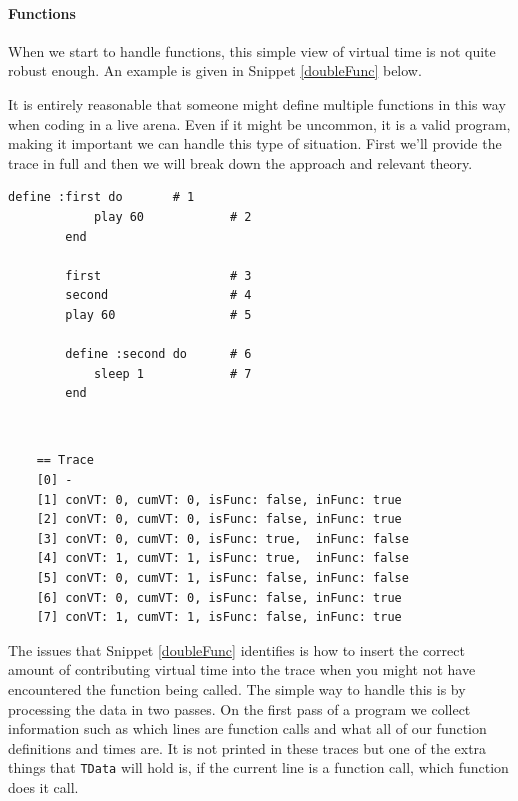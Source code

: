 \documentclass[11pt, abstracton, twoside]{scrartcl}
\begin{document}
\paragraph{Functions}
When we start to handle functions, this simple view of virtual time is not
quite robust enough. An example is given in Snippet \ref{doubleFunc} below.

It is entirely reasonable that someone might define multiple functions in this 
way when coding in a live arena. Even if it might be uncommon, it is a valid
program, making it important we can handle this type of situation. First we'll
provide the trace in full and then we will break down the approach and relevant 
theory.

\begin{minipage}{\textwidth}
	\begin{lstlisting}[style = sonicpi]
        define :first do       # 1
            play 60            # 2
        end
        
        first                  # 3
        second                 # 4
        play 60                # 5

        define :second do      # 6
            sleep 1            # 7
        end
	\end{lstlisting}
	 \label{doubleFunc}
\end{minipage}
\\
\begin{lstlisting}
    == Trace
    [0] -
    [1] conVT: 0, cumVT: 0, isFunc: false, inFunc: true
    [2] conVT: 0, cumVT: 0, isFunc: false, inFunc: true
    [3] conVT: 0, cumVT: 0, isFunc: true,  inFunc: false
    [4] conVT: 1, cumVT: 1, isFunc: true,  inFunc: false
    [5] conVT: 0, cumVT: 1, isFunc: false, inFunc: false
    [6] conVT: 0, cumVT: 0, isFunc: false, inFunc: true
    [7] conVT: 1, cumVT: 1, isFunc: false, inFunc: true
\end{lstlisting}

The issues that Snippet \ref{doubleFunc} identifies is how to insert the correct
amount of contributing virtual time into the trace when you might not have 
encountered the function being called. The simple way to handle this is by processing
the data in two passes. On the first pass of a program we collect information
such as which lines are function calls and what all of our function definitions
and times are. It is not printed in these traces but one of the extra things that
\texttt{TData} will hold is, if the current line is a function call, which function
does it call.
\end{document}
